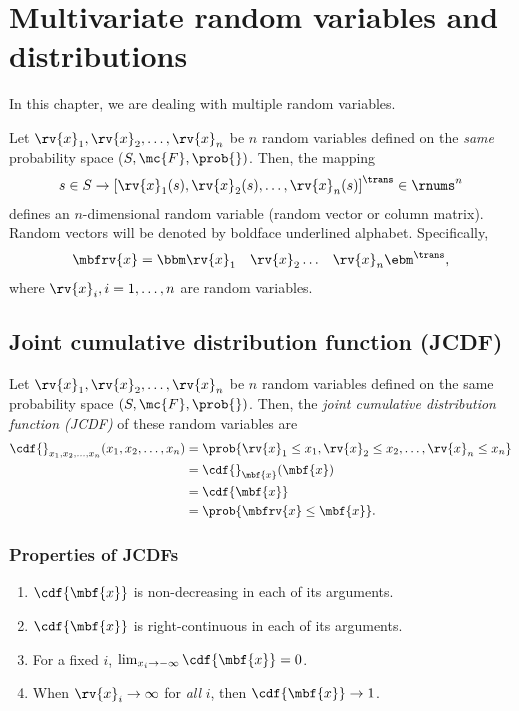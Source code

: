 \section{Multivariate random variables and distributions}
In this chapter, we are dealing with multiple random variables. 

\begin{mydefinition}
  Let $\rv{x}_{1}, \rv{x}_{2},\ldots,\rv{x}_n$ be $n$ random variables defined on the \emph{same} probability space ($S, \mc{F}, \prob{})$. Then, the mapping
  \begin{align}
      s\in S\to \left[ \rv{x}_{1}(s), \rv{x}_{2}(s),\ldots,\rv{x}_n(s) \right]^{\trans}\in\rnums^n
  \end{align}
  defines an $n$-dimensional random variable (random vector or column matrix). Random vectors will be denoted by boldface underlined alphabet. Specifically,
  \begin{align}
      \mbfrv{x} &= 
      \bbm \rv{x}_{1} & \rv{x}_{2} & \ldots &\rv{x}_n \ebm^{\trans},
  \end{align}
  where $\rv{x}_{i}, i=1,\ldots, n$ are random variables. 
\end{mydefinition}

\subsection{Joint cumulative distribution function (JCDF)}
\begin{mydefinition}
    Let $\rv{x}_{1}, \rv{x}_{2}, \ldots, \rv{x}_n$ be $n$ random variables defined on the same probability space $(S,\mc{F},\prob{})$. Then, the \emph{joint cumulative distribution function (JCDF)} of these random variables are 
    \begin{align}
        \cdf{}_{x_{1},x_{2},\ldots,x_n}(x_{1},x_{2},\ldots,x_n) 
        &= \prob{\rv{x}_{1}\leq x_{1}, \rv{x}_{2}\leq x_{2}, \ldots, \rv{x}_n\leq x_n}\\
        &= \cdf{}_{\mbf{x}}(\mbf{x})\\
        &= \cdf{\mbf{x}}\\
        &= \prob{\mbfrv{x}\leq\mbf{x}}.
    \end{align}
\end{mydefinition}
\subsubsection*{Properties of JCDFs}
\begin{enumerate}
    \item $\cdf{\mbf{x}}$ is non-decreasing in each of its arguments.
    \item $\cdf{\mbf{x}}$ is right-continuous in each of its arguments.
    \item For a fixed $i$, $\lim_{x_{i}\to-\infty} \cdf{\mbf{x}}=0$.
    \item When $\rv{x}_{i}\to\infty$ for \emph{all} $i$, then $\cdf{\mbf{x}}\to 1$.
\end{enumerate}

